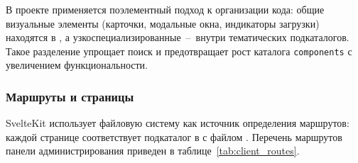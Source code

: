 В проекте применяется поэлементный подход к организации кода: общие визуальные элементы (карточки, модальные окна, индикаторы загрузки) находятся в , а узкоспециализированные~--~внутри тематических подкаталогов. Такое разделение упрощает поиск и предотвращает рост каталога \texttt{components} с увеличением функциональности.

\subsubsection{Маршруты и страницы}

SvelteKit использует файловую систему как источник определения маршрутов: каждой странице соответствует подкаталог в  с файлом . Перечень маршрутов панели администрирования приведен в таблице~\ref{tab:client_routes}.


